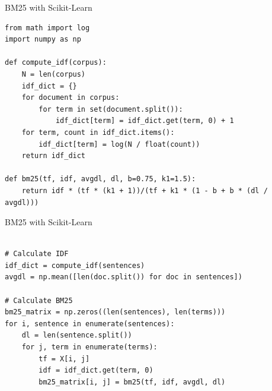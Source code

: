 \documentclass{beamer}
\begin{document}
\begin{frame}[fragile]{BM25 with Scikit-Learn}
\small
\begin{tcolorbox}[colback=lightgray, colframe=lightgray,
                  boxsep=0mm, arc=1mm, boxrule=0mm,
                  left=1mm, right=1mm, top=1mm, bottom=1mm]
\begin{Verbatim}[fontsize=\scriptsize, bgcolor=lightgray]
from math import log
import numpy as np

def compute_idf(corpus):
    N = len(corpus)
    idf_dict = {}
    for document in corpus:
        for term in set(document.split()):
            idf_dict[term] = idf_dict.get(term, 0) + 1
    for term, count in idf_dict.items():
        idf_dict[term] = log(N / float(count))
    return idf_dict

def bm25(tf, idf, avgdl, dl, b=0.75, k1=1.5):
    return idf * (tf * (k1 + 1))/(tf + k1 * (1 - b + b * (dl / avgdl)))
\end{Verbatim}
\end{tcolorbox}

\end{frame}

\begin{frame}[fragile]{BM25 with Scikit-Learn}
\small
\begin{tcolorbox}[colback=lightgray, colframe=lightgray,
                  boxsep=0mm, arc=1mm, boxrule=0mm,
                  left=1mm, right=1mm, top=1mm, bottom=1mm]
\begin{Verbatim}[fontsize=\scriptsize, bgcolor=lightgray]

# Calculate IDF
idf_dict = compute_idf(sentences)
avgdl = np.mean([len(doc.split()) for doc in sentences])

# Calculate BM25
bm25_matrix = np.zeros((len(sentences), len(terms)))
for i, sentence in enumerate(sentences):
    dl = len(sentence.split())
    for j, term in enumerate(terms):
        tf = X[i, j]
        idf = idf_dict.get(term, 0)
        bm25_matrix[i, j] = bm25(tf, idf, avgdl, dl)

\end{Verbatim}
\end{tcolorbox}

\end{frame}
\end{document}
